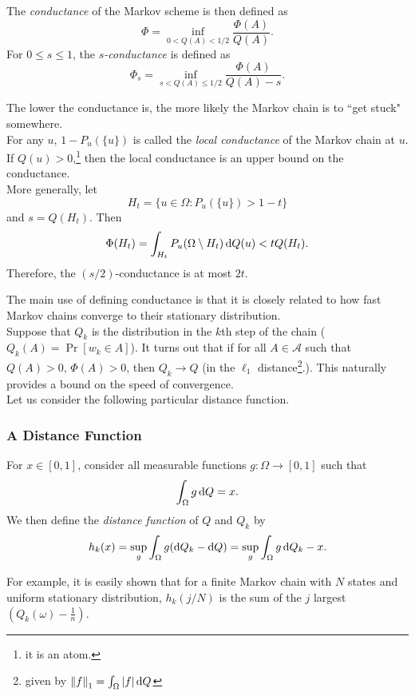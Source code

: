 \begin{fdef}
The \textit{conductance} of the Markov scheme is then defined as
\[ \Phi = \inf_{0<Q(A)<1/2} \frac{\Phi(A)}{Q(A)}. \]
For $0\leq s\leq 1$, the \textit{$s$-conductance} is defined as
\[ \Phi_s = \inf_{s < Q(A) \leq 1/2} \frac{\Phi(A)}{Q(A)-s}. \]
\end{fdef}

The lower the conductance is, the more likely the Markov chain is to ``get stuck" somewhere.\\

For any $u$, $1-P_u(\{u\})$ is called the \textit{local conductance} of the Markov chain at $u$. If $Q(u)>0$,\footnote{it is an atom.} then the local conductance is an upper bound on the conductance.\\
More generally, let
\[ H_t = \{u\in\Omega:P_u(\{u\}) > 1-t\} \]
and $s=Q(H_t)$. Then
\[ \Phi(H_t) = \int_{H_t} P_u(\Omega\setminus H_t)\operatorname{d}\!{Q}(u) < t Q(H_t). \]
Therefore, the $(s/2)$-conductance is at most $2t$.

The main use of defining conductance is that it is closely related to how fast Markov chains converge to their stationary distribution.\\
Suppose that $Q_k$ is the distribution in the $k$th step of the chain ($Q_k(A)=\Pr[w_k\in A]$). It turns out that if for all $A\in\mathcal{A}$ such that $Q(A)>0$, $\Phi(A)>0$, then $Q_k\to Q$ (in the $\ell_1$ distance\footnote{given by $\left\lVert f\right\rVert_1 = \int_\Omega |f|\operatorname{d}\!{Q}$}.). This naturally provides a bound on the speed of convergence.\\
Let us consider the following particular distance function.

\subsubsection{A Distance Function}

\begin{fdef}
For $x\in[0,1]$, consider all measurable functions $g:\Omega\to[0,1]$ such that
\[ \int_{\Omega} g\operatorname{d}\!{Q} = x. \]
We then define the \textit{distance function} of $Q$ and $Q_k$ by
\[ h_k(x) = \sup_g \int_\Omega g(\operatorname{d}\!{Q}_k-\operatorname{d}\!{Q}) = \sup_g \int_\Omega g\operatorname{d}\!{Q}_k - x. \]
\end{fdef}

For example, it is easily shown that for a finite Markov chain with $N$ states and uniform stationary distribution, $h_k(j/N)$ is the sum of the $j$ largest $\left(Q_k(\omega)-\frac{1}{n}\right)$.\\

